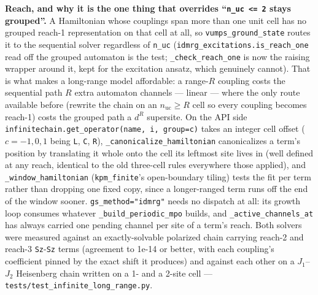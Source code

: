\documentclass[11pt]{article}
\begin{document}
\textbf{Reach, and why it is the one thing that overrides ``\texttt{n\_uc
<= 2} stays grouped''.} A Hamiltonian whose couplings span more than one
unit cell has no grouped reach-1 representation on that cell at all, so
\texttt{vumps\_ground\_state} routes it to the sequential solver
regardless of \texttt{n\_uc} (\texttt{idmrg\_excitations.is\_reach\_one}
read off the grouped automaton is the test;
\texttt{\_check\_reach\_one} is now the raising wrapper around it, kept
for the excitation ansatz, which genuinely cannot). That is what makes a
long-range model affordable: a range-$R$ coupling costs the sequential
path $R$ extra automaton channels --- linear --- where the only route
available before (rewrite the chain on an $n_{\mathrm{uc}} \ge R$ cell so
every coupling becomes reach-1) costs the grouped path a $d^{R}$
supersite. On the API side
\texttt{infinitechain.get\_operator(name, i, group=c)} takes an integer
cell offset ($c = -1, 0, 1$ being \texttt{L}, \texttt{C}, \texttt{R}),
\texttt{\_canonicalize\_hamiltonian} canonicalizes a term's position by
translating it whole onto the cell its leftmost site lives in (well
defined at any reach, identical to the old three-cell rules everywhere
those applied), and \texttt{\_window\_hamiltonian}
(\texttt{kpm\_finite}'s open-boundary tiling) tests the fit per term
rather than dropping one fixed copy, since a longer-ranged term runs off
the end of the window sooner. \texttt{gs\_method="idmrg"} needs no
dispatch at all: its growth loop consumes whatever
\texttt{\_build\_periodic\_mpo} builds, and
\texttt{\_active\_channels\_at} has always carried one pending channel
per site of a term's reach. Both solvers were measured against an
exactly-solvable polarized chain carrying reach-2 and reach-3
\texttt{Sz}-\texttt{Sz} terms (agreement to 1e-14 or better, with each
coupling's coefficient pinned by the exact shift it produces) and against
each other on a $J_1$--$J_2$ Heisenberg chain written on a 1- and a
2-site cell --- \texttt{tests/test\_infinite\_long\_range.py}.
\end{document}
